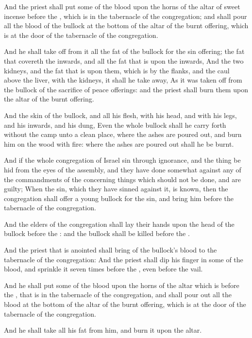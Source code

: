 \Verse And the priest shall put some of the blood upon the horns of the altar of sweet incense before the \LORD, which is in the tabernacle of the congregation; and shall pour all the blood of the bullock at the bottom of the altar of the burnt offering, which is at the door of the tabernacle of the congregation.

\Verse And he shall take off from it all the fat of the bullock for the sin offering; the fat that covereth the inwards, and all the fat that is upon the inwards, \Verse And the two kidneys, and the fat that is upon them, which is by the flanks, and the caul above the liver, with the kidneys, it shall he take away, \Verse As it was taken off from the bullock of the sacrifice of peace offerings: and the priest shall burn them upon the altar of the burnt offering.

\Verse And the skin of the bullock, and all his flesh, with his head, and with his legs, and his inwards, and his dung, \Verse Even the whole bullock shall he carry forth without the camp unto a clean place, where the ashes are poured out, and burn him on the wood with fire: where the ashes are poured out shall he be burnt.

\Verse And if the whole congregation of Israel sin through ignorance, and the thing be hid from the eyes of the assembly, and they have done somewhat against any of the commandments of the \LORD concerning things which should not be done, and are guilty; \Verse When the sin, which they have sinned against it, is known, then the congregation shall offer a young bullock for the sin, and bring him before the tabernacle of the congregation.

\Verse And the elders of the congregation shall lay their hands upon the head of the bullock before the \LORD: and the bullock shall be killed before the \LORD.

\Verse And the priest that is anointed shall bring of the bullock's blood to the tabernacle of the congregation: \Verse And the priest shall dip his finger in some of the blood, and sprinkle it seven times before the \LORD, even before the vail.

\Verse And he shall put some of the blood upon the horns of the altar which is before the \LORD, that is in the tabernacle of the congregation, and shall pour out all the blood at the bottom of the altar of the burnt offering, which is at the door of the tabernacle of the congregation.

\Verse And he shall take all his fat from him, and burn it upon the altar.

